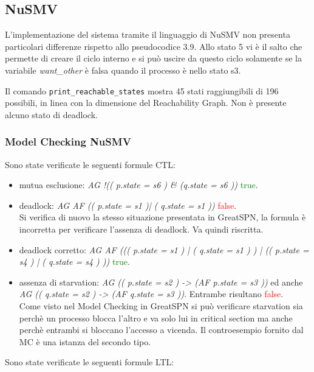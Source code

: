 \documentclass[a4paper]{article}
\begin{document}
\subsection{NuSMV}
L'implementazione del sistema tramite il linguaggio di NuSMV non presenta particolari differenze rispetto allo pseudocodice 3.9. Allo stato 5 vi è il salto che permette di creare il ciclo interno e si può uscire da questo ciclo solamente se la variabile \textit{want\_other} è falsa quando il processo è nello stato s3.

Il comando \texttt{print\_reachable\_states} mostra 45 stati raggiungibili di 196 possibili, in linea con la dimensione del Reachability Graph.
Non è presente alcuno stato di deadlock.
\subsubsection{Model Checking NuSMV}
Sono state verificate le seguenti formule CTL:
\begin{itemize}
        \item mutua esclusione: \textit{AG !(( p.state = s6 ) \& (q.state = s6 ))} \textcolor{green}{true}.
        \item deadlock: \textit{AG AF (( p.state = s1 )| ( q.state = s1 ))} \textcolor{red}{false}.\\
		Si verifica di nuovo la stesso situazione presentata in GreatSPN, la formula è incorretta per verificare l'assenza di deadlock. Va quindi riscritta.

        \item deadlock corretto: \textit{AG AF ((( p.state = s1 ) | ( q.state = s1 ) ) | (( p.state = s4 ) | ( q.state = s4 ) ))} \textcolor{green}{true}.\\
        \item assenza di starvation: \textit{AG (( p.state = s2 ) -> (AF p.state = s3 ))} ed anche \textit{AG (( q.state = s2 ) -> (AF q.state = s3 ))}. Entrambe risultano \textcolor{red}{false}.\\
		Come visto nel Model Checking in GreatSPN si può verificare starvation sia perchè un processo blocca l'altro e va solo lui in critical section ma anche perchè entrambi si bloccano l'accesso a vicenda.
		Il controesempio fornito dal MC è una istanza del secondo tipo.
\end{itemize}
Sono state verificate le seguenti formule LTL:
\end{document}
